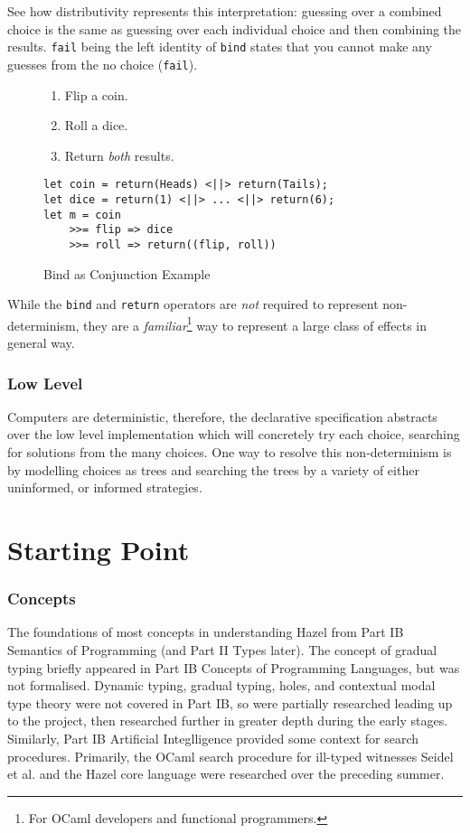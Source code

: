 See how distributivity represents this interpretation:  guessing over a combined choice is the same as guessing over each individual choice and then combining the results. \texttt{fail} being the left identity of \texttt{bind} states that you cannot make any guesses from the no choice (\texttt{fail}). 
\begin{figure}[h]\centering
\begin{enumerate}
\item Flip a coin.
\item Roll a dice.
\item Return \textit{both} results.
\end{enumerate}
\begin{verbatim}
let coin = return(Heads) <||> return(Tails);
let dice = return(1) <||> ... <||> return(6);
let m = coin 
    >>= flip => dice
    >>= roll => return((flip, roll))
\end{verbatim}
\caption{Bind as Conjunction Example}
\label{fig:Conjunction}
\end{figure}

While the \texttt{bind} and \texttt{return} operators are \textit{not} required to represent non-determinism, they are a \textit{familiar}\footnote{For OCaml developers and functional programmers.} way to represent a large class of effects in general way. 

\subsubsection{Low Level}
Computers are deterministic, therefore, the declarative specification abstracts over the low level implementation which will concretely try each choice, searching for solutions from the many choices. One way to resolve this non-determinism is by modelling choices as trees and searching the trees by a variety of either uninformed, or informed strategies.

\section{Starting Point}\label{sec:StartingPoint}
\subsubsection{Concepts}
The foundations of most concepts in understanding Hazel from Part IB Semantics of Programming (and Part II Types later). The concept of gradual typing briefly appeared in Part IB Concepts of Programming Languages, but was not formalised. Dynamic typing, gradual typing, holes, and contextual modal type theory were not covered in Part IB, so were partially researched leading up to the project, then researched further in greater depth during the early stages. Similarly, Part IB Artificial Integlligence provided some context for search procedures. Primarily, the OCaml search procedure for ill-typed witnesses Seidel et al. \cite{SearchProc} and the Hazel core language \cite{HazelLivePaper} were researched over the preceding summer.

